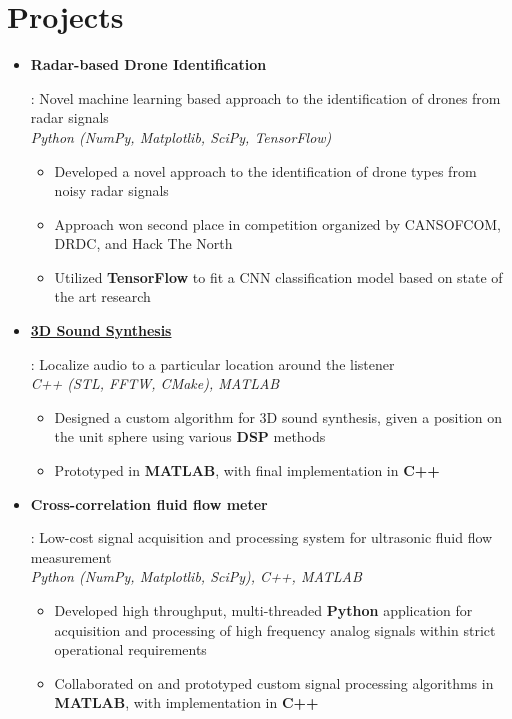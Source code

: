 \documentclass[letterpaper,11pt]{article}
\newcommand{\resumeItemNoBullet}[2]{
  \item[]\small{
    \hspace{-9pt}\textbf{#1}{: #2 \vspace{-6pt}}
  }
}
\newcommand{\resumeSubItem}[2]{\resumeItemNoBullet{#1}{#2}\vspace{-4pt}}
\newcommand{\resumeSubHeadingListStart}{\begin{itemize}[leftmargin=*]}
\newcommand{\resumeSubHeadingListEnd}{\end{itemize}}
\newcommand{\shorterSection}[1]{\vspace{-10pt}\section{#1}}
\begin{document}
\shorterSection{Projects}
  \resumeSubHeadingListStart
     \resumeSubItem{Radar-based Drone Identification}
     {Novel machine learning based approach to the identification of drones from radar signals \\
     \emph{Python (NumPy, Matplotlib, SciPy, TensorFlow)}
        \vspace{-5pt}
        \begin{itemize}
            \item Developed a novel approach to the identification of drone types from noisy radar signals
            \item Approach won second place in competition organized by CANSOFCOM, DRDC, and Hack The North
            \item Utilized \textbf{TensorFlow} to fit a CNN classification model based on state of the art research
        \end{itemize}
     }
     \vspace{5pt}
  \resumeSubItem{\href{https://github.com/davidgur/3d-sound-synthesis}{3D Sound Synthesis}}
  {Localize audio to a particular location around the listener \\
      \emph{C++ (STL, FFTW, CMake), MATLAB}
        \vspace{-5pt}
        \begin{itemize}
            \item Designed a custom algorithm for 3D sound synthesis, given a position on the unit sphere using various \textbf{DSP} methods
            \item Prototyped in \textbf{MATLAB}, with final implementation in \textbf{C++}
        \end{itemize}
     }
     \vspace{5pt}
     \resumeSubItem{Cross-correlation fluid flow meter}
     {Low-cost signal acquisition and processing system for ultrasonic fluid flow measurement\\
         \emph{Python (NumPy, Matplotlib, SciPy), C++, MATLAB}
        \vspace{-5pt}
        \begin{itemize}
            \item Developed high throughput, multi-threaded \textbf{Python} application for acquisition and processing of high frequency analog signals within strict operational requirements
            \item Collaborated on and prototyped custom signal processing algorithms in \textbf{MATLAB}, with implementation in \textbf{C++}
        \end{itemize}
     }
  \resumeSubHeadingListEnd
\end{document}
